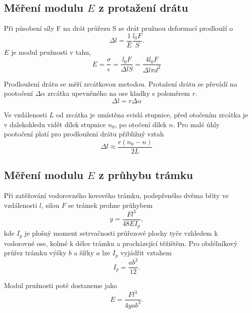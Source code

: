 \documentclass[protokol.tex]{subfiles}
\begin{document}
\subsection*{Měření modulu $E$ z protažení drátu}
Při působení síly F na drát průřezu S se drát pružnou deformací  prodlouží o \cite{stud_text}
\begin{equation} \label{eq:delta_l}
\Delta l = \frac{1}{E}\frac{l_0 F}{S}.
\end{equation}
$E$ je modul pružnosti v tahu, \cite{stud_text}
\begin{equation} \label{eq:modul_dratu}
E = \frac{\sigma}{\epsilon} = \frac{l_0 F}{\Delta l S} = \frac{4 l_0 F}{\Delta l \pi d^2}
\end{equation}

Prodloužení drátu se měří zrcátkovou metodou. Protažení drátu se převádí na pootočení $\Delta \alpha$ zrcátka upevněného na ose kladky s poloměrem $r$. \cite{stud_text}
\begin{equation} \label{eq:alpha}
\Delta l = r \Delta \alpha
\end{equation}

Ve vzdálenosti $L$ od zrcátka je umístěna svislá stupnice, před otočením zrcátka je v dalekohledu vidět dílek stupnice $n_0$, po otočení dílek $n$. Pro malé úhly pootočení platí pro prodloužení drátu přibližný vztah \cite{stud_text}
\begin{equation} \label{eq:delta_l_2}
\Delta l \approx \frac{r (n_0 - n)}{2 L}
\end{equation}

\subsection*{Měření modulu $E$ z průhybu trámku}
Při zatěžování vodorovného kovového trámku, podepřeného dvěma břity ve vzdálenosti $l$, silou $F$ se trámek prohne průhybem 
\begin{equation}
y = \frac{F l^3}{48 E I_p},
\end{equation}
kde $I_p$ je plošný moment setrvačnosti průřezové plochy tyče vzhledem k vodorovné ose, kolmé k délce trámku a procházející těžištěm. Pro obdélníkový průřez trámku výšky $b$ a šířky $a$ lze $I_p$ vyjádřit vztahem
\begin{equation}
I_p = \frac{ab^3}{12}.
\end{equation}

Modul pružnosti poté dostaneme jako 
\begin{equation} \label{eq:modul_prohnuti}
E = \frac{F l^3}{4 y a b^3}.
\end{equation}
\end{document}
